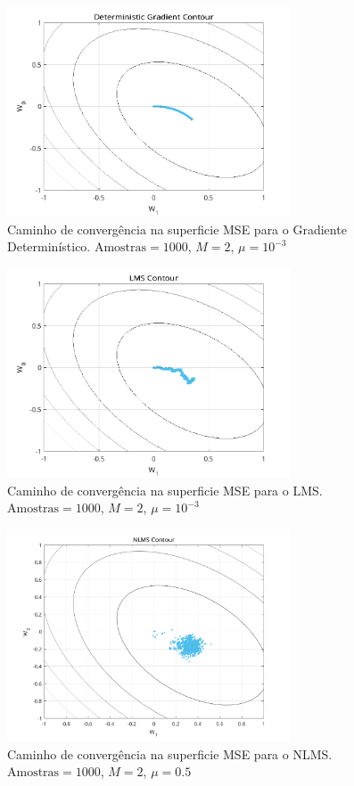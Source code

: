 \documentclass[a4paper,10pt]{article}
\begin{document}
\begin{enumerate}
				\begin{figure}[H]
					\centering
					\includegraphics[width=0.75\textwidth]{figs/gradient_contour.png}
					\caption{Caminho de convergência na superficie MSE para o Gradiente Determinístico. $\text{Amostras} = 1000$, $M = 2$, $\mu = 10^{-3}$}
					\label{fig:gradient_contour}
				\end{figure}

				\begin{figure}[H]
					\centering
					\includegraphics[width=0.75\textwidth]{figs/lms_contour.png}
					\caption{Caminho de convergência na superficie MSE para o LMS. $\text{Amostras} = 1000$, $M = 2$, $\mu = 10^{-3}$}
					\label{fig:lms_contour}
				\end{figure}

				\begin{figure}[H]
					\centering
					\includegraphics[width=0.75\textwidth]{figs/nlms_contour.png}
					\caption{Caminho de convergência na superficie MSE para o NLMS. $\text{Amostras} = 1000$, $M = 2$, $\mu = 0.5$}
					\label{fig:nlms_contour}
				\end{figure}


\end{enumerate}
\end{document}
